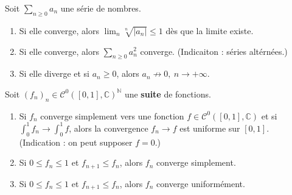 \documentclass[a4paper,10pt]{article}
\newcommand{\N}{\mathbb{N}}
\newcommand{\C}{\mathbb{C}}
\newcommand{\abs}[1]{\left|#1\right|}
\begin{document}
\noindent
Soit $\sum_{n\geq0} a_n$ une série de nombres.
\begin{enumerate}[label=\alph*)]
    \item Si elle converge, alors $\lim_n\sqrt[n]{\abs{a_n}} \leq 1$ dès que la limite existe.
    \item Si elle converge, alors $\sum_{n\geq0} a_n^2$ converge. (Indicaiton : séries altérnées.)
    \item Si elle diverge et si $a_n\geq0$, alors $a_n \not\to 0,~n\to+\infty$.
\end{enumerate}
Soit $(f_n)_n\in\mathcal{C}^0([0,1],\C)^\N$ une \textbf{suite} de fonctions.
\begin{enumerate}[resume*]
    \item Si $f_n$ converge simplement vers une fonction $f\in\mathcal{C}^0([0,1],\C)$ et si $\int_0^1f_n \to \int_0^1 f$, alors la convergence $f_n \to f$ est uniforme sur $[0,1]$. (Indication : on peut supposer $f=0$.)\footnotemark
    \item Si $0 \leq f_n \leq 1$ et $f_{n+1}\leq f_n$, alors $f_n$ converge simplement.
    \item Si $0 \leq f_n \leq 1$ et $f_{n+1}\leq f_n$, alors $f_n$ converge uniformément.
\end{enumerate}





\vspace{.1in}
\end{document}
